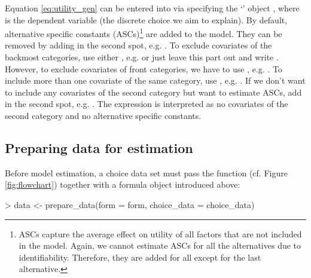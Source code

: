\documentclass[article]{jss}
\newcommand{\class}[1]{`\code{#1}'}
\newcommand{\fct}[1]{\code{#1()}}
\begin{document}
Equation \eqref{eq:utility_gen} can be entered into  via specifying the \class{formula} object , where  is the dependent variable (the discrete choice we aim to explain). By default, alternative specific constants (ASCs)\footnote{ASCs capture the average effect on utility of all factors that are not included in the model. Again, we cannot estimate ASCs for all the alternatives due to identifiability. Therefore, they are added for all except for the last alternative.} are added to the model. They can be removed by adding  in the second spot, e.g. . To exclude covariates of the backmost categories, use either , e.g.  or just leave this part out and write . However, to exclude covariates of front categories, we have to use , e.g. . To include more than one covariate of the same category, use \code{+}, e.g. . If we don't want to include any covariates of the second category but want to estimate ASCs, add  in the second spot, e.g. . The expression  is interpreted as no covariates of the second category and no alternative specific constants.

\subsection{Preparing data for estimation} \label{subsec:prepare_data}

Before model estimation, a choice data set  must pass the \fct{prepare\_data} function (cf. Figure \ref{fig:flowchart}) together with a formula object  introduced above:

\begin{Schunk}
\begin{Sinput}
> data <- prepare_data(form = form, choice_data = choice_data)
\end{Sinput}
\end{Schunk}
\end{document}
